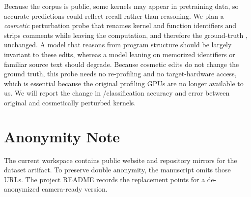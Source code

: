 Because the corpus is public, some kernels may appear in pretraining data, so accurate predictions could reflect recall rather than reasoning.
We plan a \emph{cosmetic} perturbation probe that renames kernel and function identifiers and strips comments while leaving the computation, and therefore the ground-truth \rai, unchanged.
A model that reasons from program structure should be largely invariant to these edits, whereas a model leaning on memorized identifiers or familiar source text should degrade.
Because cosmetic edits do not change the ground truth, this probe needs no re-profiling and no target-hardware access, which is essential because the original profiling GPUs are no longer available to us.
We will report the change in \bandwidthbound/\computebound classification accuracy and \rai error between original and cosmetically perturbed kernels.

\section{Anonymity Note}

The current workspace contains public website and repository mirrors for the dataset artifact.
To preserve double anonymity, the manuscript omits those URLs.
The project README records the replacement points for a de-anonymized camera-ready version.
